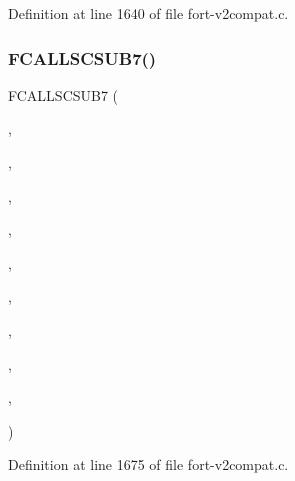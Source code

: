 Definition at line 1640 of file fort-\/v2compat.\+c.

\mbox{\label{fort-v2compat_8c_a6584fce06fb0b25e58067f361f19bc73}} 
\subsubsection{\texorpdfstring{F\+C\+A\+L\+L\+S\+C\+S\+U\+B7()}{FCALLSCSUB7()}\hspace{0.1cm}{\footnotesize\ttfamily [4/4]}}
{\footnotesize\ttfamily F\+C\+A\+L\+L\+S\+C\+S\+U\+B7 (\begin{DoxyParamCaption}\item[{\hyperlink{nf__v2compat_8c_aed57d7a73cd3e59ce0a99597aa180e7b}{c\+\_\+ncaptc}}]{,  }\item[{N\+C\+A\+P\+TC}]{,  }\item[{\hyperlink{nf__fortv2_8f90_a525301fbfb8b1e885e1531ed31e16565}{ncaptc}}]{,  }\item[{N\+C\+ID}]{,  }\item[{V\+A\+R\+ID}]{,  }\item[{S\+T\+R\+I\+NG}]{,  }\item[{T\+Y\+PE}]{,  }\item[{C\+O\+U\+NT}]{,  }\item[{C\+B\+UF}]{,  }\item[{\hyperlink{fort-v2compat_8c_ae2352f39cbd25bcaf1bedbbb12db73fe}{P\+R\+C\+O\+DE}}]{ }\end{DoxyParamCaption})}



Definition at line 1675 of file fort-\/v2compat.\+c.

\mbox{\label{fort-v2compat_8c_a0892717e2482b175ac5d0da166cbe6e9}} 
